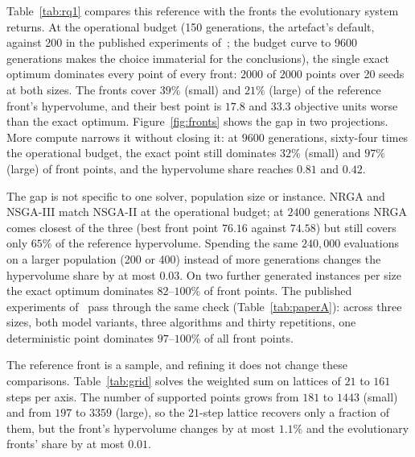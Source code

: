 \documentclass[systems,article,submit,moreauthors,pdftex]{Definitions/mdpi}
\begin{document}
Table~\ref{tab:rq1} compares this reference with the fronts the evolutionary system
returns. At the operational budget (150 generations, the artefact's default, against 200 in the
published experiments of~\cite{rabiei2026resilient}; the budget curve to 9600 generations makes the
choice immaterial for the conclusions), the
single exact optimum dominates every point of every front: $2000$ of $2000$ points over
20 seeds at both sizes. The fronts cover $39\%$ (small) and $21\%$ (large) of the reference
front's hypervolume, and their best point is $17.8$ and $33.3$ objective units worse than the
exact optimum. Figure~\ref{fig:fronts} shows the gap in two projections.
More compute narrows it without closing it: at $9600$ generations, sixty-four times the
operational budget, the exact point still dominates $32\%$ (small) and $97\%$ (large) of
front points, and the hypervolume share reaches $0.81$ and $0.42$.

The gap is not specific to one solver, population size or instance. NRGA and NSGA-III
match NSGA-II at the operational budget; at $2400$ generations NRGA comes closest of the
three (best front point $76.16$ against $74.58$) but still covers only $65\%$ of the reference
hypervolume. Spending the same $240{,}000$ evaluations on a larger population (200 or 400)
instead of more generations changes the hypervolume share by at most $0.03$. On two further
generated instances per size the exact optimum dominates $82$--$100\%$ of front points.
The published experiments of~\cite{rabiei2026resilient} pass through the same check
(Table~\ref{tab:paperA}): across three sizes, both model variants, three algorithms and
thirty repetitions, one deterministic point dominates $97$--$100\%$ of all front points.

The reference front is a sample, and refining it does not change these comparisons.
Table~\ref{tab:grid} solves the weighted sum on lattices of $21$ to $161$ steps per axis. The
number of supported points grows from $181$ to $1443$ (small) and from $197$ to $3359$ (large),
so the $21$-step lattice recovers only a fraction of them, but the front's hypervolume changes
by at most $1.1\%$ and the evolutionary fronts' share by at most $0.01$.
\end{document}
